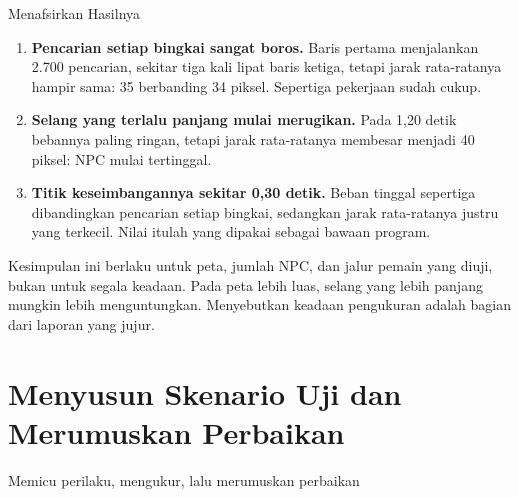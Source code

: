 \documentclass[aspectratio=169,10pt]{beamer}
\begin{document}
\begin{frame}{Menafsirkan Hasilnya}
\begin{enumerate}
  \item \textbf{Pencarian setiap bingkai sangat boros.} Baris pertama menjalankan
        2.700 pencarian, sekitar tiga kali lipat baris ketiga, tetapi jarak
        rata-ratanya hampir sama: 35 berbanding 34 piksel. Sepertiga pekerjaan
        sudah cukup.
  \item \textbf{Selang yang terlalu panjang mulai merugikan.} Pada 1,20 detik
        bebannya paling ringan, tetapi jarak rata-ratanya membesar menjadi 40
        piksel: NPC mulai tertinggal.
  \item \textbf{Titik keseimbangannya sekitar 0,30 detik.} Beban tinggal
        sepertiga dibandingkan pencarian setiap bingkai, sedangkan jarak
        rata-ratanya justru yang terkecil. Nilai itulah yang dipakai sebagai
        bawaan program.
\end{enumerate}
\vspace{0.12cm}
\begin{peringatan}
Kesimpulan ini berlaku untuk peta, jumlah NPC, dan jalur pemain yang diuji,
bukan untuk segala keadaan. Pada peta lebih luas, selang yang lebih panjang
mungkin lebih menguntungkan. Menyebutkan keadaan pengukuran adalah bagian dari
laporan yang jujur.
\end{peringatan}
\end{frame}

\section{Menyusun Skenario Uji dan Merumuskan Perbaikan}
  {Memicu perilaku, mengukur, lalu merumuskan perbaikan}
\end{document}
